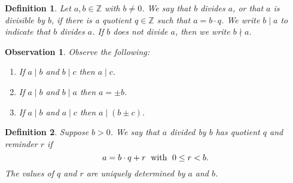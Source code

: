 \documentclass[10pt,varwidth=6in,margin=0.2in,preview]{standalone}
\newtheorem*{_definition}{Definition}
\newtheorem*{_observation}{Observation}
\begin{document}
\begin{flushleft}

\begin{_definition}
Let $a, b \in \mathbb{Z}$ with $b \neq 0$. We say that $b$ divides $a$, or that $a$ is divisible by $b$, if there is a quotient $q \in \mathbb{Z}$ such that $a = b \cdot q$. We write $b \mid a$ to indicate that $b$ divides $a$. If $b$ does not divide $a$, then we write $b \nmid a$.
\end{_definition}

\begin{_observation} Observe the following:

\begin{enumerate}[label=(\alph*)]
\item If $a \mid b$ and $b \mid c$ then $a \mid c$.
\item If $a \mid b$ and $b \mid a$ then $a = \pm b$.
\item If $a \mid b$ and $a \mid c$ then $a \mid (b \pm c)$.
\end{enumerate}
\end{_observation}

\begin{_definition}
Suppose $b > 0$. We say that $a$ divided by $b$ has quotient $q$ and reminder $r$ if
\[a = b \cdot q + r \text{\; with\; } 0 \le r < b.\]
The values of $q$ and $r$ are uniquely determined by $a$ and $b$.
\end{_definition}


\end{flushleft}
\end{document}
